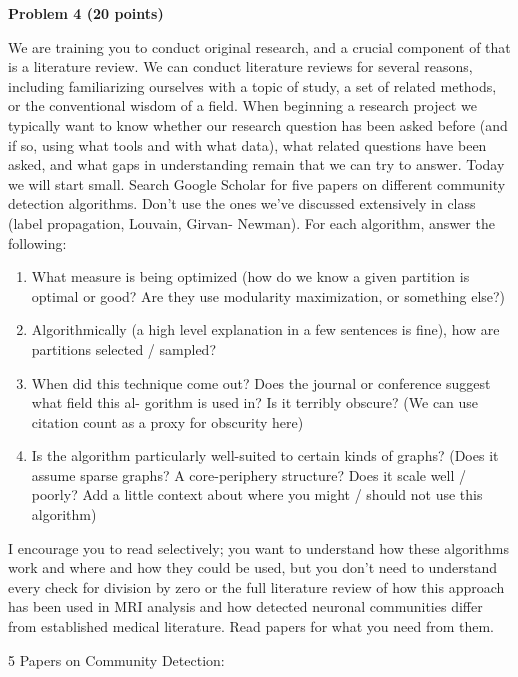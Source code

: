 \documentclass[11pt]{article}
\begin{document}
\begin{problemstmt}
    \textbf{Problem 4 (20 points)}

We are training you to conduct original research, and a crucial
component of that is a literature review. We can conduct literature
reviews for several reasons, including familiarizing ourselves with a
topic of study, a set of related methods, or the conventional wisdom of
a field. When beginning a research project we typically want to know
whether our research question has been asked before (and if so, using
what tools and with what data), what related questions have been asked,
and what gaps in understanding remain that we can try to answer. Today
we will start small. Search Google Scholar for five papers on different
community detection algorithms. Don't use the ones we've discussed
extensively in class (label propagation, Louvain, Girvan- Newman). For
each algorithm, answer the following:

\begin{enumerate}
\def\labelenumi{(\alph{enumi})}
\item
  What measure is being optimized (how do we know a given partition is
  optimal or good? Are they use modularity maximization, or something
  else?)
\item
  Algorithmically (a high level explanation in a few sentences is fine),
  how are partitions selected / sampled?
\item
  When did this technique come out? Does the journal or conference
  suggest what field this al- gorithm is used in? Is it terribly
  obscure? (We can use citation count as a proxy for obscurity here)
\item
  Is the algorithm particularly well-suited to certain kinds of graphs?
  (Does it assume sparse graphs? A core-periphery structure? Does it
  scale well / poorly? Add a little context about where you might /
  should not use this algorithm)
\end{enumerate}

I encourage you to read selectively; you want to understand how these
algorithms work and where and how they could be used, but you don't need
to understand every check for division by zero or the full literature
review of how this approach has been used in MRI analysis and how
detected neuronal communities differ from established medical
literature. Read papers for what you need from them.
\end{problemstmt}


 5 Papers on Community Detection:
\end{document}
